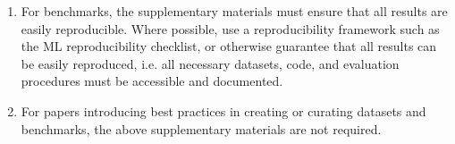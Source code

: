 \begin{enumerate}
\item For benchmarks, the supplementary materials must ensure that all results are easily reproducible. Where possible, use a reproducibility framework such as the ML reproducibility checklist, or otherwise guarantee that all results can be easily reproduced, i.e. all necessary datasets, code, and evaluation procedures must be accessible and documented.

\item For papers introducing best practices in creating or curating datasets and benchmarks, the above supplementary materials are not required.
\end{enumerate}

